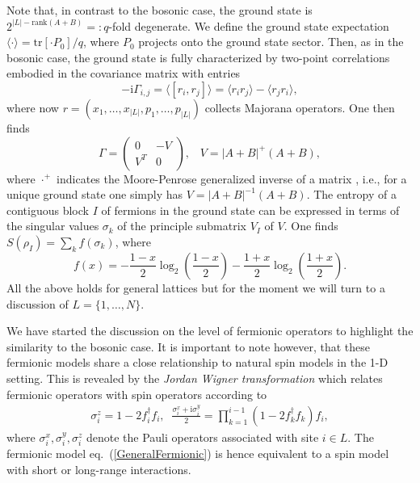 \documentclass[rmp,twocolumn,floatfix,epsfig,graphics]{revtex4} %
\newcommand{\mi}{\mathrm{i} }
\begin{document}
Note that, in contrast to the bosonic case, the ground state 
is $2^{|L|-\text{rank}(A+B)}=:q$-fold degenerate. We define
the ground state expectation $\langle\cdot\rangle=\text{tr}
[\cdot P_0]/q$, where $P_0$ projects onto the ground state 
sector. Then, as in the bosonic case, the ground state is 
fully characterized by two-point correlations embodied in 
the covariance matrix with entries
\begin{equation*}
        -\mi\Gamma_{i,j} = \langle\left[r_i,r_j\right]\rangle
        = \langle r_ir_j\rangle-\langle r_jr_i\rangle,
\end{equation*}
where now $r=(x_1,\dots,x_{|L|},p_1,\dots,p_{|L|})$ collects 
Majorana operators. One then finds
\begin{equation}\label{FermionicGamma}
        \Gamma=\left(\begin{array}{cc}
           0&-V\\
           V^T&0
        \end{array}\right),\;\;\; V=|A+B|^{+}(A+B),
\end{equation} 
where $\cdot^+$ indicates the Moore-Penrose generalized inverse 
of a matrix \cite{HornJohnson}, i.e., for a unique ground state one 
simply has $V=|A+B|^{-1}(A+B)$. The entropy of a contiguous
block $I$ of fermions in the ground state can be expressed 
in terms of the singular values $\sigma_k$ of the principle submatrix 
$V_I$ of $V$. One finds $S(\rho_I)=\sum_{k}f(\sigma_k)$, 
where
\begin{equation}
\label{fermionEntropy}
        f(x)=-\frac{1-x}{2}\log_2\left(\frac{1-x}{2}\right)-
        \frac{1+x}{2}\log_2\left(\frac{1+x}{2}\right).
\end{equation}
All the above holds for general lattices but for the moment
we will turn to a discussion of $L=\{1,\dots, N\}$.

We have started the discussion on the level of fermionic
operators to highlight the similarity to the bosonic case. It
is important to note however, that these fermionic models share 
a close relationship to natural spin models in the 1-D setting.
This is revealed by the {\it Jordan Wigner transformation} which 
relates fermionic operators with spin operators according to
\begin{eqnarray}
        \sigma^z_i= 1- 2 f_i^\dagger f_i,\;\;
        \frac{\sigma^x_i+ \mi \sigma^y_i}{2} = \prod_{k=1}^{i-1} (1-2 f_k^\dagger f_k) f_i,
\end{eqnarray}
where $\sigma^x_i,\sigma^y_i,\sigma^z_i$ denote the Pauli 
operators associated with site $i\in L$. The fermionic model 
eq.\ (\ref{GeneralFermionic}) is hence equivalent to a spin model 
with short or long-range interactions.
\end{document}
